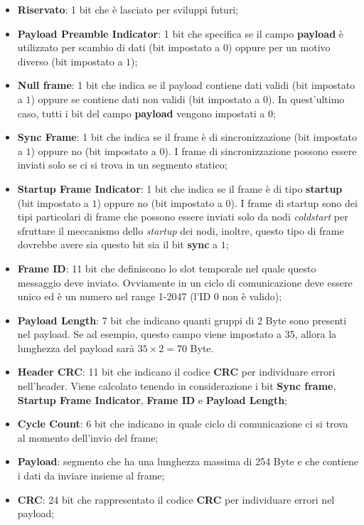 \begin{itemize}
    \item \textbf{Riservato}: 1 bit che è lasciato per sviluppi futuri;
    \item \textbf{Payload Preamble Indicator}:  1 bit che specifica se il campo \textbf{payload} è utilizzato per scambio di dati (bit impostato a $0$) oppure per un motivo diverso (bit impostato a $1$);
    \item \textbf{Null frame}: 1 bit che indica se il payload contiene dati validi (bit impostato a $1$) oppure se contiene dati non validi (bit impostato a $0$). In quest'ultimo caso, tutti i bit del campo \textbf{payload} vengono impostati a 0;
    \item \textbf{Sync Frame}: 1 bit che indica se il frame è di sincronizzazione (bit impostato a $1$) oppure no (bit impostato a $0$). I frame di sincronizzazione possono essere inviati solo se ci si trova in un segmento statico;
    \item \textbf{Startup Frame Indicator}: 1 bit che indica se il frame è di tipo \textbf{startup} (bit impostato a $1$) oppure no (bit impostato a $0$). I frame di startup sono dei tipi particolari di frame che possono essere inviati solo da nodi \emph{coldstart} per sfruttare il meccanismo dello \emph{startup} dei nodi, inoltre, questo tipo di frame dovrebbe avere sia questo bit sia il bit \textbf{sync} a $1$;
    \item \textbf{Frame ID}: 11 bit che definiscono lo slot temporale nel quale questo messaggio deve inviato. Ovviamente in un ciclo di comunicazione deve essere unico ed è un numero nel range 1-2047 (l'ID 0 non è valido);
    \item \textbf{Payload Length}: 7 bit che indicano quanti gruppi di 2 Byte sono presenti nel payload. Se ad esempio, questo campo viene impostato a 35, allora la lunghezza del payload sarà $35\times 2 = 70$ Byte.
    \item \textbf{Header CRC}: 11 bit che indicano il codice \textbf{CRC} per individuare errori nell'header. Viene calcolato tenendo in considerazione i bit \textbf{Sync frame}, \textbf{Startup Frame Indicator}, \textbf{Frame ID} e \textbf{Payload Length};
    \item \textbf{Cycle Count}: 6 bit che indicano in quale ciclo di comunicazione ci si trova al momento dell'invio del frame;
    \item \textbf{Payload}: segmento che ha una lunghezza massima di 254 Byte e che contiene i dati da inviare insieme al frame;
    \item \textbf{CRC}: 24 bit che rappresentato il codice \textbf{CRC} per individuare errori nel payload;
\end{itemize}


